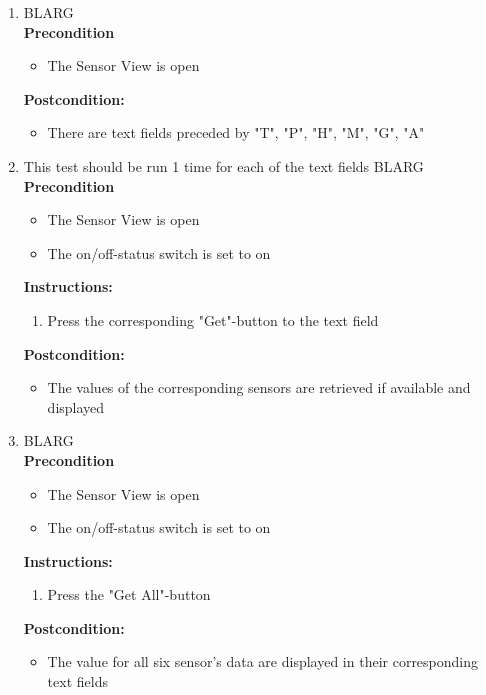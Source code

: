 \documentclass[a4paper]{article}
\newlength{\testlabellength}
\newenvironment{testlist}{\begin{enumerate}[label=\bfseries Instruction \thesubsection.\arabic* , labelindent=0pt, labelwidth=\testlabellength , leftmargin=2cm]}{\end{enumerate}}
\newenvironment{precondition}{
{\color{white}BLARG}\\ 
\textbf{Precondition}
\begin{itemize}[labelindent=0cm, labelwidth=2cm , leftmargin=1cm]
}
{\end{itemize}}
\newenvironment{instruction}{
\textbf{Instructions:}
\begin{enumerate}[label=\bfseries  \arabic*., labelindent=0cm, labelwidth=2cm , leftmargin=1cm]
}
{\end{enumerate}}
\newenvironment{postcondition}{
\textbf{Postcondition:}
\begin{itemize}[labelindent=0cm, labelwidth=2cm , leftmargin=1cm]
}
{\end{itemize}}
\begin{document}
\begin{appendices}
\begin{testlist}
	\item
		\begin{precondition}
			\item The Sensor View is open
		\end{precondition}
		\begin{postcondition}
			\item There are text fields preceded by "T", "P", "H", "M", "G", "A"
		\end{postcondition}

	\item This test should be run 1 time for each of the text fields
		\begin{precondition}
			\item The Sensor View is open
			\item The on/off-status switch is set to on
		\end{precondition}
		\begin{instruction}
			\item Press the corresponding "Get"-button to the text field
		\end{instruction}
		\begin{postcondition}
			\item The values of the corresponding sensors are retrieved if available and displayed
		\end{postcondition}


	\item
		\begin{precondition}
			\item The Sensor View is open
			\item The on/off-status switch is set to on
		\end{precondition}
		\begin{instruction}
			\item Press the "Get All"-button
		\end{instruction}
		\begin{postcondition}
			\item The value for all six sensor's data are displayed in their corresponding text fields
		\end{postcondition}


\end{testlist}
\end{appendices}
\end{document}
